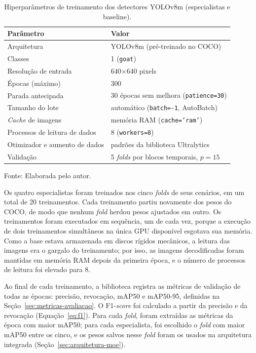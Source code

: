 \begin{table}[htb]
\centering
\caption{Hiperparâmetros de treinamento dos detectores YOLOv8m (especialistas e baseline).}
\label{tab:hiperparametros-yolo}
\begin{tabular}{ll}
\hline
\textbf{Parâmetro} & \textbf{Valor} \\
\hline
Arquitetura & YOLOv8m (pré-treinado no COCO) \\
Classes & 1 (\texttt{goat}) \\
Resolução de entrada & 640$\times$640 pixels \\
Épocas (máximo) & 300 \\
Parada antecipada & 30 épocas sem melhora (\texttt{patience=30}) \\
Tamanho do lote & automático (\texttt{batch=-1}, AutoBatch) \\
\textit{Cache} de imagens & memória RAM (\texttt{cache='ram'}) \\
Processos de leitura de dados & 8 (\texttt{workers=8}) \\
Otimizador e aumento de dados & padrões da biblioteca Ultralytics \\
Validação & 5 \textit{folds} por blocos temporais, $p = 15$ \\
\hline
\end{tabular}

\vspace{0.2cm}
Fonte: Elaborada pelo autor.
\end{table}

Os quatro especialistas foram treinados nos cinco \textit{folds} de seus cenários, em um total de 20 treinamentos. Cada treinamento partiu novamente dos pesos do COCO, de modo que nenhum \textit{fold} herdou pesos ajustados em outro. Os treinamentos foram executados em sequência, um de cada vez, porque a execução de dois treinamentos simultâneos na única GPU disponível esgotava sua memória. Como a base estava armazenada em discos rígidos mecânicos, a leitura das imagens era o gargalo do treinamento; por isso, as imagens decodificadas foram mantidas em memória RAM depois da primeira época, e o número de processos de leitura foi elevado para 8.

Ao final de cada treinamento, a biblioteca registra as métricas de validação de todas as épocas: precisão, revocação, mAP50 e mAP50-95, definidas na Seção~\ref{sec:metricas-avaliacao}. O F1-\textit{score} foi calculado a partir da precisão e da revocação (Equação~\ref{eq:f1}). Para cada \textit{fold}, foram extraídas as métricas da época com maior mAP50; para cada especialista, foi escolhido o \textit{fold} com maior mAP50 entre os cinco, e os pesos salvos nesse \textit{fold} foram os usados na arquitetura integrada (Seção~\ref{sec:arquitetura-moe}).

